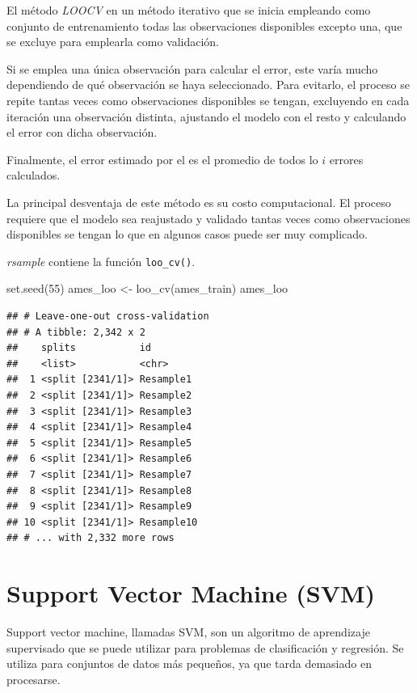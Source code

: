 \documentclass[
]{book}
\newenvironment{Shaded}{\begin{snugshade}}{\end{snugshade}}
\newcommand{\DecValTok}[1]{\textcolor[rgb]{0.00,0.00,0.81}{#1}}
\newcommand{\FunctionTok}[1]{\textcolor[rgb]{0.00,0.00,0.00}{#1}}
\newcommand{\NormalTok}[1]{#1}
\newcommand{\OtherTok}[1]{\textcolor[rgb]{0.56,0.35,0.01}{#1}}
\begin{document}
El método \emph{LOOCV} en un método iterativo que se inicia empleando como conjunto
de entrenamiento todas las observaciones disponibles excepto una, que se excluye
para emplearla como validación.

Si se emplea una única observación para calcular el error, este varía mucho
dependiendo de qué observación se haya seleccionado. Para evitarlo, el proceso
se repite tantas veces como observaciones disponibles se tengan, excluyendo en
cada iteración una observación distinta, ajustando el modelo con el resto y
calculando el error con dicha observación.

Finalmente, el error estimado por el es el promedio de todos lo \(i\) errores calculados.

La principal desventaja de este método es su costo computacional.
El proceso requiere que el modelo sea reajustado y validado tantas veces como observaciones disponibles
se tengan lo que en algunos casos puede ser muy complicado.

\emph{rsample} contiene la función \texttt{loo\_cv()}.

\begin{Shaded}
\begin{Highlighting}[]
\FunctionTok{set.seed}\NormalTok{(}\DecValTok{55}\NormalTok{)}
\NormalTok{ames\_loo }\OtherTok{\textless{}{-}} \FunctionTok{loo\_cv}\NormalTok{(ames\_train)}
\NormalTok{ames\_loo}
\end{Highlighting}
\end{Shaded}

\begin{verbatim}
## # Leave-one-out cross-validation 
## # A tibble: 2,342 x 2
##    splits           id        
##    <list>           <chr>     
##  1 <split [2341/1]> Resample1 
##  2 <split [2341/1]> Resample2 
##  3 <split [2341/1]> Resample3 
##  4 <split [2341/1]> Resample4 
##  5 <split [2341/1]> Resample5 
##  6 <split [2341/1]> Resample6 
##  7 <split [2341/1]> Resample7 
##  8 <split [2341/1]> Resample8 
##  9 <split [2341/1]> Resample9 
## 10 <split [2341/1]> Resample10
## # ... with 2,332 more rows
\end{verbatim}

\hypertarget{support-vector-machine-svm}{%
\chapter{Support Vector Machine (SVM)}\label{support-vector-machine-svm}}

Support vector machine, llamadas SVM, son un algoritmo de aprendizaje supervisado que se puede utilizar para problemas de clasificación y regresión. Se utiliza para conjuntos de datos más pequeños, ya que tarda demasiado en procesarse.
\end{document}
